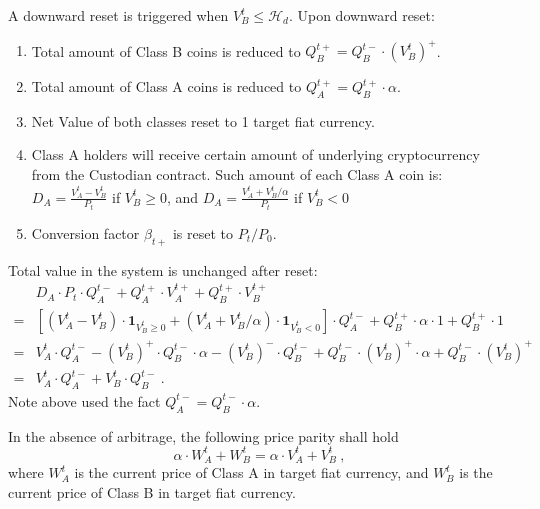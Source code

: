 \documentclass[draft, noinfoline]{ectaart}
\numberwithin{equation}{section}
\theoremstyle{plain}
\begin{document}
\begin{appendices}
A downward reset is triggered when $V_{B}^{t}\leqslant\mathcal{H}_{d}$. Upon downward reset:
\begin{enumerate}
\item Total amount of Class B coins is reduced to $Q_{B}^{t+}=Q_{B}^{t-}\cdot (V_{B}^{t})^+$.
\item Total amount of Class A coins is reduced to $Q_{A}^{t+}=Q_{B}^{t+}\cdot\alpha$.
\item Net Value of both classes reset to 1 target fiat currency.
\item Class A holders will receive certain amount of underlying cryptocurrency from the Custodian contract. Such amount of each Class A coin is: $D_{A}=\frac{V_{A}^{t}-V_{B}^{t}}{P_{t}}$ if $V_B^t\ge 0$, and $D_{A}=\frac{V_{A}^{t}+V_{B}^{t}/\alpha}{P_{t}}$ if $V_B^t< 0$
\item Conversion factor $\beta_{t+}$ is reset to $P_t/P_0$.
\end{enumerate}
Total value in the system is unchanged after reset:
\begin{align*}
 & D_{A}\cdot P_{t}\cdot Q_{A}^{t-}+Q_{A}^{t+}\cdot V_{A}^{t+}+Q_{B}^{t+}\cdot V_{B}^{t+}\\
= & \left[\left(V_{A}^{t}-V_{B}^{t}\right)\cdot\mathbf{1}_{V_B^t\ge 0}+\left(V_{A}^{t}+V_{B}^{t}/\alpha\right)\cdot\mathbf{1}_{V_B^t< 0}\right]\cdot Q_{A}^{t-}+Q_{B}^{t+}\cdot\alpha\cdot1+Q_{B}^{t+}\cdot1\\
= & V_{A}^{t}\cdot Q_{A}^{t-}-(V_{B}^{t})^+\cdot Q_{B}^{t-}\cdot\alpha-(V_{B}^{t})^-\cdot Q_{B}^{t-}+Q_{B}^{t-}\cdot (V_{B}^{t})^+\cdot\alpha+Q_{B}^{t-}\cdot (V_{B}^{t})^+\\
= & V_{A}^{t}\cdot Q_{A}^{t-}+V_{B}^{t}\cdot Q_{B}^{t-}\ .
\end{align*}
Note above used the fact $Q_{A}^{t-}=Q_{B}^{t-}\cdot\alpha$.




In the absence of arbitrage, the following price parity shall hold
\[
\alpha\cdot W_{A}^{t}+W_{B}^{t}=\alpha\cdot V_{A}^{t}+V_{B}^{t}\ ,
\]
where $W_{A}^{t}$ is the current price of Class A in target fiat currency, and $W_{B}^{t}$ is the current price of Class B in target fiat currency.


\end{appendices}
\end{document}
